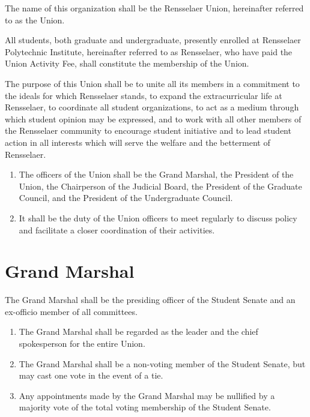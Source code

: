 \documentclass{uniondoc}
\begin{document}

The name of this organization shall be the Rensselaer Union, hereinafter referred to as the Union.


All students, both graduate and undergraduate, presently enrolled at Rensselaer Polytechnic Institute, hereinafter referred to as Rensselaer, who have paid the Union Activity Fee, shall constitute the membership of the Union.


The purpose of this Union shall be to unite all its members in a commitment to the ideals for which Rensselaer stands, to expand the extracurricular life at Rensselaer, to coordinate all student organizations, to act as a medium through which student opinion may be expressed, and to work with all other members of the Rensselaer community to encourage student initiative and to lead student action in all interests which will serve the welfare and the betterment of Rensselaer.


\begin{enumerate}
\item The officers of the Union shall be the Grand Marshal, the President of the Union, the Chairperson of the Judicial Board, the President of the Graduate Council, and the President of the Undergraduate Council.
\item It shall be the duty of the Union officers to meet regularly to discuss policy and facilitate a closer coordination of their activities.
\end{enumerate}

\section{Grand Marshal}

The Grand Marshal shall be the presiding officer of the Student Senate and an ex-officio member of all committees.

\begin{enumerate}
\item The Grand Marshal shall be regarded as the leader and the chief spokesperson for the entire Union.
\item The Grand Marshal shall be a non-voting member of the Student Senate, but may cast one vote in the event of a tie.
\item Any appointments made by the Grand Marshal may be nullified by a majority vote of the total voting membership of the Student Senate.
\end{enumerate}
\end{document}
